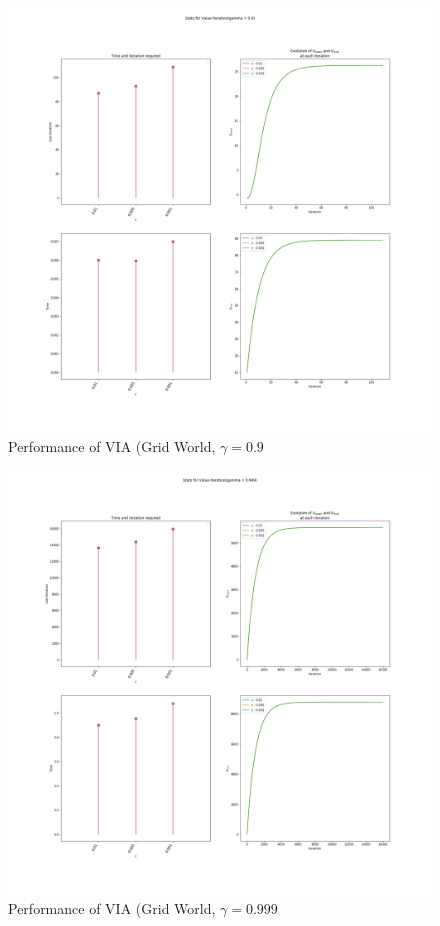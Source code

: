 \documentclass[11pt]{article}
\begin{document}
\begin{multicols}{2}
\begin{figure}[H]
\centering
\includegraphics[width = 0.9\columnwidth]{VI_GW_0.9.png}
\caption{Performance of VIA (Grid World, $\gamma = 0.9$}
\end{figure}

\begin{figure}[H]
\centering
\includegraphics[width = 0.9\columnwidth]{VI_GW_0.999.png}
\caption{Performance of VIA (Grid World, $\gamma = 0.999$}
\end{figure}




\end{multicols}
\end{document}
